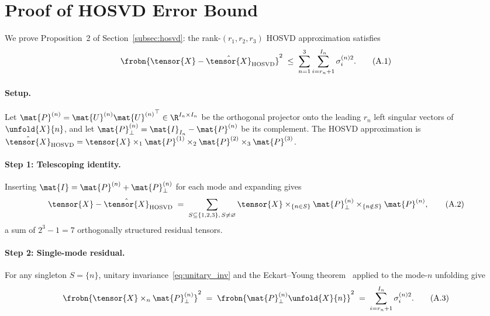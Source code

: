 
\section{Proof of HOSVD Error Bound}
\label{app:hosvd_proof}

We prove Proposition~2 of Section~\ref{subsec:hosvd}: the rank-$(r_1,r_2,r_3)$
HOSVD approximation satisfies
\begin{equation}
  \frobn{\tensor{X} - \hat{\tensor{X}}_{\mathrm{HOSVD}}}^2
  \;\leq\;
  \sum_{n=1}^{3} \sum_{i=r_n+1}^{I_n} \sigma_i^{(n)2}.
  \tag{A.1}
  \label{eq:app_bound}
\end{equation}

\paragraph{Setup.}
Let $\mat{P}^{(n)} = \mat{U}^{(n)}{\mat{U}^{(n)}}^\top \in \R^{I_n \times I_n}$
be the orthogonal projector onto the leading $r_n$ left singular vectors of
$\unfold{X}{n}$, and let $\mat{P}^{(n)}_\perp = \mat{I}_{I_n} - \mat{P}^{(n)}$
be its complement.
The HOSVD approximation is
$\hat{\tensor{X}}_{\mathrm{HOSVD}} = \tensor{X}
  \times_1 \mat{P}^{(1)} \times_2 \mat{P}^{(2)} \times_3 \mat{P}^{(3)}$.

\paragraph{Step 1: Telescoping identity.}
Inserting $\mat{I} = \mat{P}^{(n)} + \mat{P}^{(n)}_\perp$ for each mode and
expanding gives
\begin{equation}
  \tensor{X} - \hat{\tensor{X}}_{\mathrm{HOSVD}}
  \;=\;
  \sum_{S \subseteq \{1,2,3\},\, S \neq \varnothing}
  \tensor{X}
    \times_{\{n \in S\}} \mat{P}^{(n)}_\perp
    \times_{\{n \notin S\}} \mat{P}^{(n)},
  \tag{A.2}
\end{equation}
a sum of $2^3 - 1 = 7$ orthogonally structured residual tensors.

\paragraph{Step 2: Single-mode residual.}
For any singleton $S = \{n\}$, unitary invariance~\eqref{eq:unitary_inv} and
the Eckart--Young theorem~\cite{eckart1936approximation} applied to the
mode-$n$ unfolding give
\begin{equation}
  \frobn{\tensor{X} \times_n \mat{P}^{(n)}_\perp}^2
  \;=\; \frobn{\mat{P}^{(n)}_\perp \unfold{X}{n}}^2
  \;=\; \sum_{i=r_n+1}^{I_n} \sigma_i^{(n)2}.
  \tag{A.3}
\end{equation}

